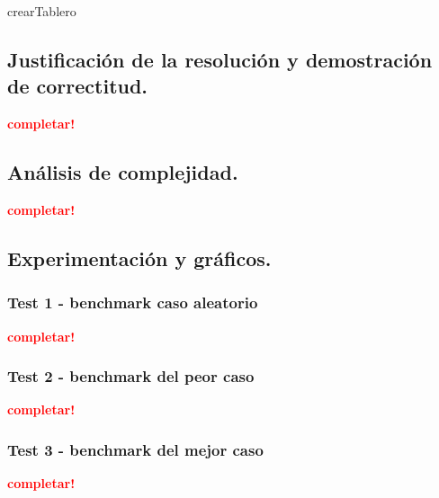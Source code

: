 crearTablero

\newpage
\subsection{Justificación de la resolución y demostración de correctitud.}

\vspace*{0.3cm}

\textcolor{red}{\textbf{completar!}}



\newpage
\subsection{Análisis de complejidad.}

\vspace*{0.3cm}

\textcolor{red}{\textbf{completar!}}



\newpage
\subsection{Experimentación y gráficos.}

\vspace*{0.3cm}

\subsubsection{Test 1 - benchmark caso aleatorio}

\textcolor{red}{\textbf{completar!}}


\newpage
\subsubsection{Test 2 - benchmark del peor caso}

\textcolor{red}{\textbf{completar!}}


\newpage
\subsubsection{Test 3 - benchmark del mejor caso}

\textcolor{red}{\textbf{completar!}}

